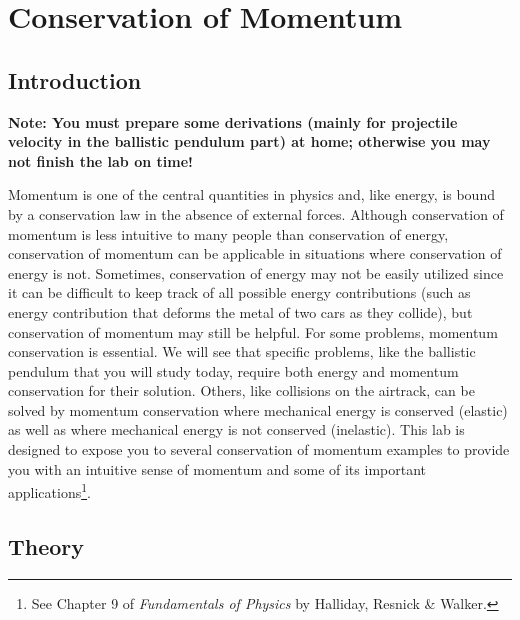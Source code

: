 \chapter{Conservation of Momentum}
\label{chap:conservationofmomentum}
{}
\makeatletter
\newcommand{\enumeratext}[1]{%
\setcounter{saveenumerate}{\value{enum\romannumeral\the\@enumdepth}}
\end{enumerate}
#1
\begin{enumerate}
\setcounter{enum\romannumeral\the\@enumdepth}{\value{saveenumerate}}%
}
\makeatother

\section{Introduction}

\textbf{Note: You must prepare some derivations (mainly for projectile velocity in the ballistic pendulum part) at home; otherwise you may not finish the lab on time!}

Momentum is one of the central quantities in physics and, like energy, is bound by a conservation law in the absence of external forces. Although conservation of momentum is less intuitive to many people than conservation of energy, conservation of momentum can be applicable in situations where conservation of energy is not. Sometimes, conservation of energy may not be easily utilized since it can be difficult to keep track of all possible energy contributions (such as energy contribution that deforms the metal of two cars as they collide), but conservation of momentum may still be helpful. For some problems, momentum conservation is essential. We will see that specific problems, like the ballistic pendulum that you will study today, require both energy and momentum conservation for their solution. Others, like collisions on the airtrack, can be solved by momentum conservation where mechanical energy is conserved (elastic) as well as where mechanical energy is not conserved (inelastic). This lab is designed to expose you to several conservation of momentum examples to provide you with an intuitive sense of momentum and some of its important applications\footnote{See Chapter 9 of \emph{Fundamentals of Physics} by Halliday, Resnick \& Walker.}.\myskip

\section{Theory}
